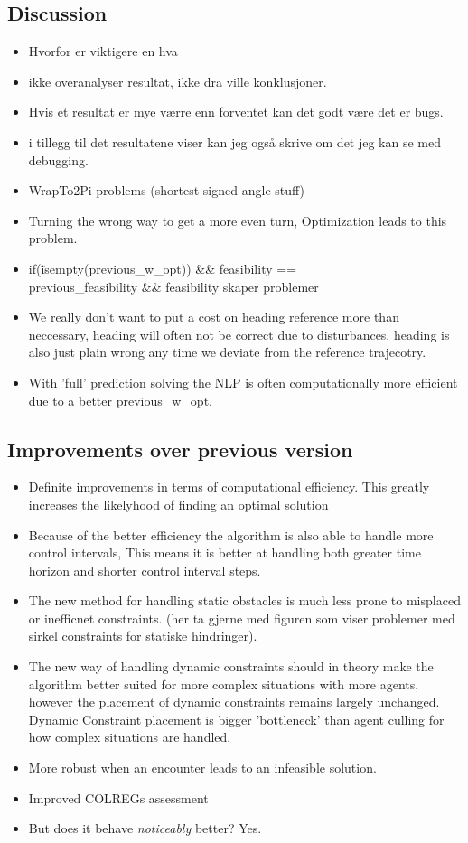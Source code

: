 \subsection{Discussion}
\begin{itemize}
    \item Hvorfor er viktigere en hva
    \item ikke overanalyser resultat, ikke dra ville konklusjoner.
    \item Hvis et resultat er mye værre enn forventet kan det godt være det er bugs.
    \item i tillegg til det resultatene viser kan jeg også skrive om det jeg kan se med debugging.
    \item WrapTo2Pi problems (shortest signed angle stuff)
    \item Turning the wrong way to get a more even turn, Optimization leads to this problem. 
    \item if(\~isempty(previous\_w\_opt)) \&\& feasibility == \\
     previous\_feasibility \&\& feasibility     skaper problemer 
    \item We really don't want to put a cost on heading reference more than neccessary, heading will often not be correct due to disturbances.
    heading is also just plain wrong any time we deviate from the reference trajecotry.
    \item With 'full' prediction solving the NLP is often computationally more efficient due to a better previous\_w\_opt.
\end{itemize}

\subsection{Improvements over previous version}
\begin{itemize}
    \item Definite improvements in terms of computational efficiency. This greatly increases the likelyhood of finding an optimal solution 
    \item Because of the better efficiency the algorithm is also able to handle more control intervals, This means it is better at handling both greater time horizon and shorter control interval steps.
    \item The new method for handling static obstacles is much less prone to misplaced or inefficnet constraints. (her ta gjerne med figuren som viser problemer med sirkel constraints for statiske hindringer).
    \item The new way of handling dynamic constraints should in theory make the algorithm better suited for more complex situations with more agents, however the placement of dynamic constraints remains largely unchanged.
    Dynamic Constraint placement is bigger 'bottleneck' than agent culling for how complex situations are handled. 
    \item More robust when an encounter leads to an infeasible solution.
    \item Improved COLREGs assessment
    \item But does it behave \textit{noticeably} better? Yes.
\end{itemize}

\newpage